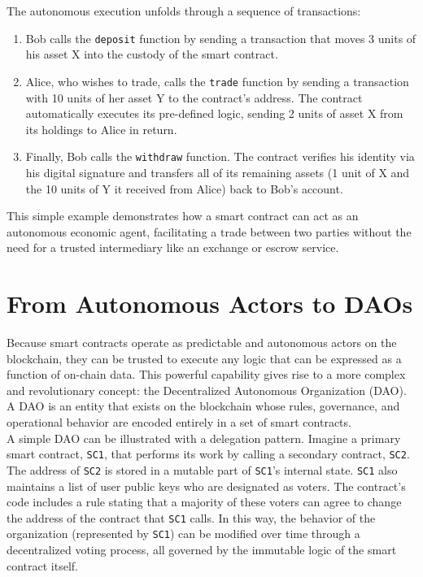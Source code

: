 \documentclass{scrbook}
\begin{document}
The autonomous execution unfolds through a sequence of transactions:

\begin{enumerate}
    \item Bob calls the \texttt{deposit} function by sending a transaction that moves 3 units of his asset X into the custody of the smart contract.
    \item Alice, who wishes to trade, calls the \texttt{trade} function by sending a transaction with 10 units of her asset Y to the contract's address. The contract automatically executes its pre-defined logic, sending 2 units of asset X from its holdings to Alice in return.
    \item Finally, Bob calls the \texttt{withdraw} function. The contract verifies his identity via his digital signature and transfers all of its remaining assets (1 unit of X and the 10 units of Y it received from Alice) back to Bob's account.
\end{enumerate}

This simple example demonstrates how a smart contract can act as an autonomous economic agent, facilitating a trade between two parties without the need for a trusted intermediary like an exchange or escrow service.

\chapter{From Autonomous Actors to DAOs}

Because smart contracts operate as predictable and autonomous actors on the blockchain, they can be trusted to execute any logic that can be expressed as a function of on-chain data. This powerful capability gives rise to a more complex and revolutionary concept: the Decentralized Autonomous Organization (DAO). A DAO is an entity that exists on the blockchain whose rules, governance, and operational behavior are encoded entirely in a set of smart contracts.\\

A simple DAO can be illustrated with a delegation pattern. Imagine a primary smart contract, \texttt{SC1}, that performs its work by calling a secondary contract, \texttt{SC2}. The address of \texttt{SC2} is stored in a mutable part of \texttt{SC1}'s internal state. \texttt{SC1} also maintains a list of user public keys who are designated as voters. The contract's code includes a rule stating that a majority of these voters can agree to change the address of the contract that \texttt{SC1} calls. In this way, the behavior of the organization (represented by \texttt{SC1}) can be modified over time through a decentralized voting process, all governed by the immutable logic of the smart contract itself.
\end{document}
